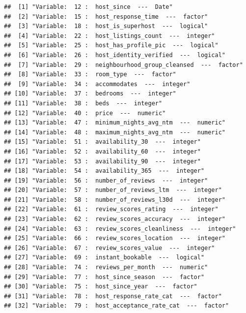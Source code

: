 \begin{verbatim}
##  [1] "Variable:  12 :  host_since  ---  Date"                    
##  [2] "Variable:  15 :  host_response_time  ---  factor"          
##  [3] "Variable:  18 :  host_is_superhost  ---  logical"          
##  [4] "Variable:  22 :  host_listings_count  ---  integer"        
##  [5] "Variable:  25 :  host_has_profile_pic  ---  logical"       
##  [6] "Variable:  26 :  host_identity_verified  ---  logical"     
##  [7] "Variable:  29 :  neighbourhood_group_cleansed  ---  factor"
##  [8] "Variable:  33 :  room_type  ---  factor"                   
##  [9] "Variable:  34 :  accommodates  ---  integer"               
## [10] "Variable:  37 :  bedrooms  ---  integer"                   
## [11] "Variable:  38 :  beds  ---  integer"                       
## [12] "Variable:  40 :  price  ---  numeric"                      
## [13] "Variable:  47 :  minimum_nights_avg_ntm  ---  numeric"     
## [14] "Variable:  48 :  maximum_nights_avg_ntm  ---  numeric"     
## [15] "Variable:  51 :  availability_30  ---  integer"            
## [16] "Variable:  52 :  availability_60  ---  integer"            
## [17] "Variable:  53 :  availability_90  ---  integer"            
## [18] "Variable:  54 :  availability_365  ---  integer"           
## [19] "Variable:  56 :  number_of_reviews  ---  integer"          
## [20] "Variable:  57 :  number_of_reviews_ltm  ---  integer"      
## [21] "Variable:  58 :  number_of_reviews_l30d  ---  integer"     
## [22] "Variable:  61 :  review_scores_rating  ---  integer"       
## [23] "Variable:  62 :  review_scores_accuracy  ---  integer"     
## [24] "Variable:  63 :  review_scores_cleanliness  ---  integer"  
## [25] "Variable:  66 :  review_scores_location  ---  integer"     
## [26] "Variable:  67 :  review_scores_value  ---  integer"        
## [27] "Variable:  69 :  instant_bookable  ---  logical"           
## [28] "Variable:  74 :  reviews_per_month  ---  numeric"          
## [29] "Variable:  77 :  host_since_season  ---  factor"           
## [30] "Variable:  75 :  host_since_year  ---  factor"             
## [31] "Variable:  78 :  host_response_rate_cat  ---  factor"      
## [32] "Variable:  79 :  host_acceptance_rate_cat  ---  factor"
\end{verbatim}

\begin{Shaded}
\begin{Highlighting}[]
\CommentTok{\#\}}
  
\end{Highlighting}
\end{Shaded}

